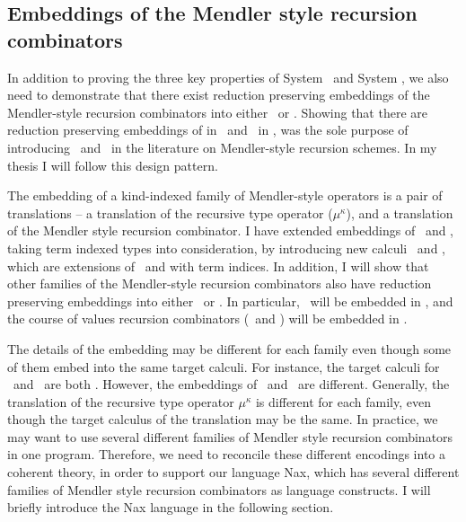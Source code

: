 \subsection{Embeddings of the Mendler style recursion combinators} In
addition to proving the three key properties of System \Fi\ and System
\Fixi, we also need to demonstrate that there exist reduction preserving
embeddings of the Mendler-style recursion combinators into either \Fi\ or
\Fixi. Showing that there are reduction preserving embeddings of \MIt in
\Fw\ and \MPr\ in \Fixw, was the sole purpose of introducing \Fw\ and \Fixw\ in
the literature on Mendler-style recursion schemes. In my thesis
I will follow this design pattern.

The embedding of a kind-indexed family of Mendler-style operators is
a pair of translations -- a translation of the recursive type operator
($\mu^\kappa$), and a translation of the Mendler style recursion combinator. 
I have extended embeddings of \MIt\ and \MPr, taking term indexed
types into consideration, by introducing new calculi \Fi\ and \Fixw,
which are extensions of \Fw\ and \Fixi with term indices. In addition,
I will show that other families of the Mendler-style recursion combinators
also have reduction preserving embeddings into either \Fi\ or \Fixi.
In particular, \MsfIt\ will be embedded in \Fi, and the course of values
recursion combinators (\McvIt\ and \McvPr) will be embedded in \Fixi.

The details of the embedding may be different for each family even though
some of them embed into the same target calculi. For instance, the target
calculi for \MIt\ and \MsfIt\ are both \Fi. However, the embeddings
of \MIt\ and \MsfIt\ are different. Generally, the translation of
the recursive type operator $\mu^\kappa$ is different for each family,
even though the target calculus of the translation may be the same.
In practice, we may want to use several different families of Mendler style
recursion combinators in one program. Therefore, we need to reconcile
these different encodings into a coherent theory, in order to support
our language Nax, which has several different families of Mendler style
recursion combinators as language constructs. I will briefly introduce
the Nax language in the following section.

